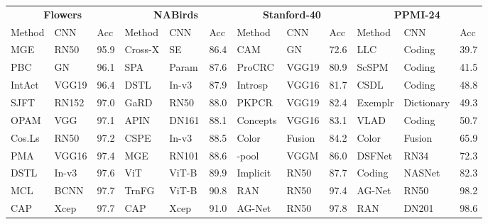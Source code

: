 \documentclass[journal]{IEEEtran}
\begin{document}
\begin{table*}[t]
\begin{small}
\begin{tabular}{|p{1.7 cm} p{8 mm} p{5 mm}|p{1.7 cm} p{8 mm} p{5 mm}|p{1.8 cm} p{8 mm} p{5 mm}|p{1.9 cm} p{13 mm} p{5 mm}|}
    \hline
    \hline
 \multicolumn{3}{|c|}{\textbf{Flowers}} &
  \multicolumn{3}{|c|}{\textbf{NABirds} \cite{van2015building}} & \multicolumn{3}{|c|}{\textbf{Stanford-40} \cite{yao2011human}} & \multicolumn{3}{|c|}{\textbf{PPMI-24} \cite{yao2010grouplet}}\\
     {Method} & {CNN} &  {Acc} &  {Method} & {CNN} & {Acc} & {Method} & {CNN} & {Acc} & {Method} & {CNN} & {Acc} \\ 
      \hline 
 MGE\cite {zhang2019learning} & RN50  & 95.9 &
 Cross-X \cite {luo2019cross} & SE  & 86.4 & 
  CAM  \cite{zhou2016learning} & GN &72.6 & 
  LLC \cite{wang2010locality} & Coding & 39.7 \\
  PBC \cite{huang2016pbc} & GN & 96.1 & 
  SPA \cite{ali2019parametric} & Param  &87.6  &
  ProCRC \cite{cai2016probabilistic} & VGG19 & 80.9 & 
  ScSPM \cite{yang2009linear} & Coding  & 41.5\\
IntAct \cite {xie2016interactive} & VGG19   & 96.4 & DSTL  \cite{cui2018large} & In-v3 &87.9 & 
Introsp \cite{rosenfeld2016visual} &VGG16 & 81.7 & 
CSDL \cite{gao2013learning} & Coding  & 48.8  \\
SJFT  \cite{ge2017borrowing} & RN152  & 97.0 & GaRD\cite{zhao2021graph} & RN50 & 88.0  & 
PKPCR \cite{lan2018prior} & VGG19 & 82.4 & 
Exemplr \cite{Hu2013recognising} &  Dictionary  &49.3 \\
OPAM  \cite{peng2017object} & VGG  & 97.1 & 
  APIN \cite{zhuang2020learning}  &DN161  &88.1  & 
Concepts  \cite{RosenfeldU16b} & VGG16 & 83.1 & 
VLAD \cite{zhang2016towards} & Coding  &50.7  \\
Cos.Ls\cite{barz2020deep} & RN50 &	97.2 & CSPE \cite {korsch2019classification} & In-v3   & 88.5 & 
Color  \cite{lavinia2020new} & Fusion &84.2 &  
Color \cite{lavinia2020new} & Fusion &65.9 \\ 
PMA  \cite{song2020bi} & VGG16 &97.4  & MGE \cite{zhang2019learning} & RN101  &88.6 & 
-pool \cite{simon2017generalized} & VGGM &86.0 & 
DSFNet \cite{li2020deep} & RN34  &72.3 \\
DSTL  \cite{cui2018large} & In-v3  & 97.6  & 
ViT{\color{orange}} \cite{dosovitskiy2020image} & ViT-B &	89.9 & Implicit \cite{simon2018whole} & RN50 & 87.7 & 
Coding \cite{li2018reassessing} &  NASNet & 82.3  \\
MCL \cite{chang2020devil} & BCNN  &97.7 &  
TrnFG{\color{orange}}\cite{he2021transfg} & ViT-B  & 90.8 &  RAN \cite{behera2020regional} & RN50 &97.4 & 
 AG-Net \cite{bera2021attend} & RN50 & 98.2 \\
CAP \cite{behera2021context} &Xcep  &97.7 & CAP \cite{behera2021context} &Xcep &91.0 & AG-Net \cite{bera2021attend} & RN50 &97.8 & RAN \cite{behera2020regional} & DN201 & 98.6\\

\end{tabular}
\end{small}
\end{table*}
\end{document}
